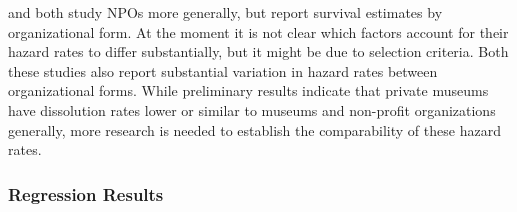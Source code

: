 \documentclass[12pt]{article}
\begin{document}
\textcite{Hager_2001_vulnerability} and \textcite{Gordon_etal_2013_insolvency} both study NPOs more generally, but report survival estimates by organizational form.
At the moment it is not clear which factors account for their hazard rates to differ substantially, but it might be due to selection criteria.
Both these studies also report substantial variation in hazard rates between organizational forms.
While preliminary results indicate that private museums have dissolution rates lower or similar to museums and non-profit organizations generally, more research is needed to establish the comparability of these hazard rates.





\subsubsection*{Regression Results}
\end{document}
